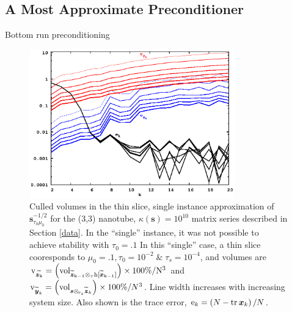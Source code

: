 \documentclass[letterpaper,twocolumn,amsmath,amsfont,amssymb,english,aps,jcp,preprintnumbers,groupaddress,nofootinbib,tightenlines,floatfix]{revtex4}
\newcommand{\mat}[1]{\boldsymbol{#1}}
\newcommand{\ot}{  {\scriptstyle \otimes}_{ \tau } }
\newcommand{\ots}{ {\scriptstyle \otimes}_{ \! \tau_s } }
\theoremstyle{plain}
\theoremstyle{remark}
\theoremstyle{plain}
\begin{document}

\subsection{A Most Approximate Preconditioner}

Bottom run preconditioning 

\begin{figure}[h]\label{regularized_stab}
 \includegraphics[width=3.5in]{fig_33_tube_cond_10_regularized/33_tube_k10_regularized_stab.eps}
\caption{
Culled volumes in the thin slice, single instance approximation of $\mat{s}^{-1/2}_{\tau_0 \mu_0}$
for the (3,3) nanotube, $\kappa(\mat{s})=10^{10}$ matrix series 
described in Section \ref{data}.  In the ``single'' instance, it was not possible to achieve stability with $\tau_0=.1$
In this ``single'' case, a thin slice cooresponds to $\mu_0=.1, \tau_0=10^{-2} \;  \&  \; \tau_s=10^{-4}$, and volumes are
$\rm v_{\widetilde{\mat{z}_k}} = \left( {\rm vol}_{ \widetilde{\mat{z}}_{k-1}\ot h[\widetilde{\mat{x}}_{k-1}] } \right) \times 100\% /N^3$ and
${\rm v}_{\widetilde{\mat{y}}_k} = \left( {\rm vol}_{\mat{s}  \ots  \widetilde{\mat{z}}_{k}} \right) \times 100\% /N^3$.    
Line width increases with increasing system size. 
Also shown is the trace error, ${\rm e}_{k} = \left( N-{\rm tr}\,\mat{x}_k \right)/N$.}
\end{figure} 
\end{document}
